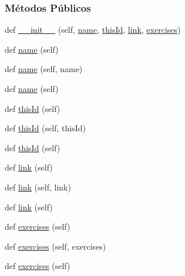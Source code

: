 \subsubsection*{Métodos Públicos}
\begin{DoxyCompactItemize}
\item 
def \hyperlink{classELO_1_1EntityUnit_1_1Lesson_a8beeba48d43c0fa4d780facb80c8fb6a}{\+\_\+\+\_\+init\+\_\+\+\_\+} (self, \hyperlink{classELO_1_1EntityUnit_1_1Lesson_a1ca164978817a007dbec8193caae96ff}{name}, \hyperlink{classELO_1_1EntityUnit_1_1Lesson_a2ec9bd43b6b7ac7c7d00469c9f586271}{this\+Id}, \hyperlink{classELO_1_1EntityUnit_1_1Lesson_a5288d46b77e4b0cfd382857ef1b82fba}{link}, \hyperlink{classELO_1_1EntityUnit_1_1Lesson_a8d3db8bfbcfd47e9f7eef8f3bdc0ee3f}{exercises})
\item 
def \hyperlink{classELO_1_1EntityUnit_1_1Lesson_ae95f28f1a9cd640fa184ee4c8fefe528}{name} (self)
\item 
def \hyperlink{classELO_1_1EntityUnit_1_1Lesson_a4076a952f59729e87573d2830f383045}{name} (self, name)
\item 
def \hyperlink{classELO_1_1EntityUnit_1_1Lesson_ae95f28f1a9cd640fa184ee4c8fefe528}{name} (self)
\item 
def \hyperlink{classELO_1_1EntityUnit_1_1Lesson_ad2584991f58cc65ff912aa2f4a4157c9}{this\+Id} (self)
\item 
def \hyperlink{classELO_1_1EntityUnit_1_1Lesson_ae3dcf38edd3060ac99d4043700313400}{this\+Id} (self, this\+Id)
\item 
def \hyperlink{classELO_1_1EntityUnit_1_1Lesson_ad2584991f58cc65ff912aa2f4a4157c9}{this\+Id} (self)
\item 
def \hyperlink{classELO_1_1EntityUnit_1_1Lesson_ae7a457f64a02c5d98fe7255838e942de}{link} (self)
\item 
def \hyperlink{classELO_1_1EntityUnit_1_1Lesson_a9d95110a6338ca0909d513958fa327f8}{link} (self, link)
\item 
def \hyperlink{classELO_1_1EntityUnit_1_1Lesson_ae7a457f64a02c5d98fe7255838e942de}{link} (self)
\item 
def \hyperlink{classELO_1_1EntityUnit_1_1Lesson_a2153c6db0d8b1f9d580df9f0d06f122e}{exercises} (self)
\item 
def \hyperlink{classELO_1_1EntityUnit_1_1Lesson_aab138e7070feb30b6bcdf6176313157f}{exercises} (self, exercises)
\item 
def \hyperlink{classELO_1_1EntityUnit_1_1Lesson_a2153c6db0d8b1f9d580df9f0d06f122e}{exercises} (self)
\end{DoxyCompactItemize}

